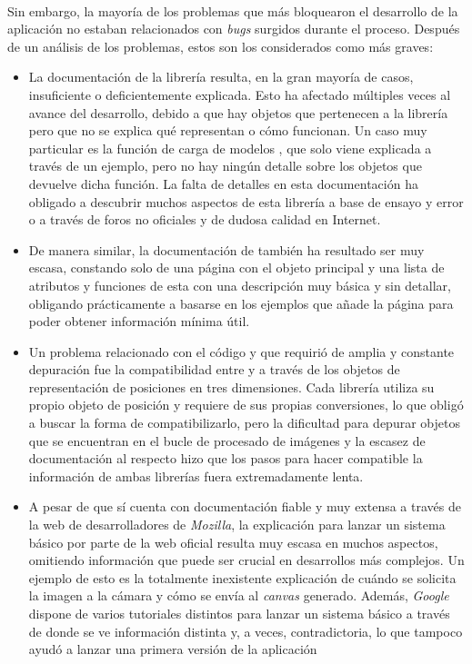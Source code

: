 \documentclass{subfiles}
\begin{document}
    \paragraph{}
    Sin embargo, la mayoría de los problemas que más bloquearon el desarrollo de la aplicación no estaban relacionados con \textit{bugs} surgidos durante el proceso. Después de un análisis de los problemas, estos son los considerados como más graves:
    \begin{itemize}
        \item La documentación de la librería \threejs resulta, en la gran mayoría de casos, insuficiente o deficientemente explicada. Esto ha afectado múltiples veces al avance del desarrollo, debido a que hay objetos que pertenecen a la librería pero que no se explica qué representan o cómo funcionan. Un caso muy particular es la función de carga de modelos \gltf, que solo viene explicada a través de un ejemplo, pero no hay ningún detalle sobre los objetos que devuelve dicha función. La falta de detalles en esta documentación ha obligado a descubrir muchos aspectos de esta librería a base de ensayo y error o a través de foros no oficiales y de dudosa calidad en Internet.
        \item De manera similar, la documentación de \resonanceaudio también ha resultado ser muy escasa, constando solo de una página con el objeto principal y una lista de atributos y funciones de esta con una descripción muy básica y sin detallar, obligando prácticamente a basarse en los ejemplos que añade la página para poder obtener información mínima útil.
        \item Un problema relacionado con el código y que requirió de amplia y constante depuración fue la compatibilidad entre \threejs y \resonanceaudio a través de los objetos de representación de posiciones en tres dimensiones. Cada librería utiliza su propio objeto de posición y requiere de sus propias conversiones, lo que obligó a buscar la forma de compatibilizarlo, pero la dificultad para depurar objetos que se encuentran en el bucle de procesado de imágenes y la escasez de documentación al respecto hizo que los pasos para hacer compatible la información de ambas librerías fuera extremadamente lenta.
        \item A pesar de que \webxr sí cuenta con documentación fiable y muy extensa a través de la web de desarrolladores de \textit{Mozilla}, la explicación para lanzar un sistema básico por parte de la web oficial resulta muy escasa en muchos aspectos, omitiendo información que puede ser crucial en desarrollos más complejos. Un ejemplo de esto es la totalmente inexistente explicación de cuándo se solicita la imagen a la cámara y cómo se envía al \textit{canvas} generado. Además, \textit{Google} dispone de varios tutoriales distintos para lanzar un sistema básico a través de \webxr donde se ve información distinta y, a veces, contradictoria, lo que tampoco ayudó a lanzar una primera versión de la aplicación
    \end{itemize}
\end{document}
